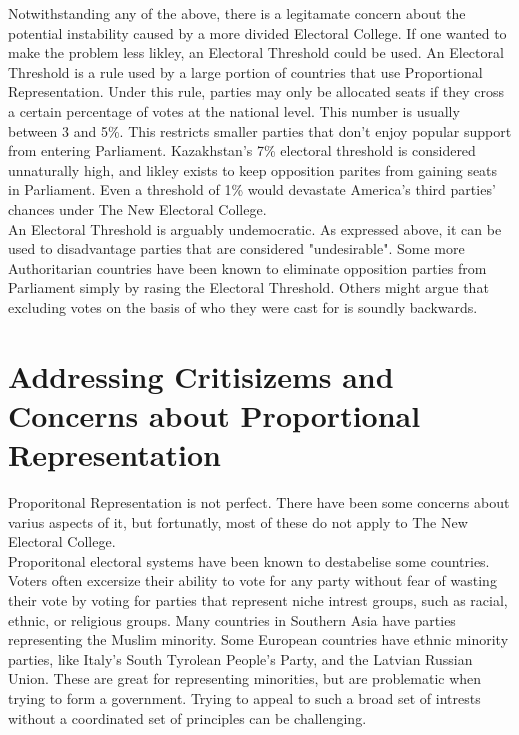 \documentclass{article}
\begin{document}
    Notwithstanding any of the above, there is a legitamate concern about the potential instability caused by a more divided Electoral College. If one wanted to make the problem less likley, an Electoral Threshold could be used. An Electoral Threshold is a rule used by a large portion of countries that use Proportional Representation. Under this rule, parties may only be allocated seats if they cross a certain percentage of votes at the national level. This number is usually between 3 and 5\%. This restricts smaller parties that don't enjoy popular support from entering Parliament. Kazakhstan's 7\% electoral threshold is considered unnaturally high, and likley exists to keep opposition parites from gaining seats in Parliament. Even a threshold of 1\% would devastate America's third parties' chances under The New Electoral College.\\

    An Electoral Threshold is arguably undemocratic. As expressed above, it can be used to disadvantage parties that are considered "undesirable". Some more Authoritarian countries have been known to eliminate opposition parties from Parliament simply by rasing the Electoral Threshold. Others might argue that excluding votes on the basis of who they were cast for is soundly backwards.\\

    \section{Addressing Critisizems and Concerns about Proportional Representation}%

    Proporitonal Representation is not perfect. There have been some concerns about varius aspects of it, but fortunatly, most of these do not apply to The New Electoral College.\\

    Proporitonal electoral systems have been known to destabelise some countries. Voters often excersize their ability to vote for any party without fear of wasting their vote by voting for parties that represent niche intrest groups, such as racial, ethnic, or religious groups. Many countries in Southern Asia have parties representing the Muslim minority. Some European countries have ethnic minority parties, like Italy's South Tyrolean People's Party, and the Latvian Russian Union. These are great for representing minorities, but are problematic when trying to form a government. Trying to appeal to such a broad set of intrests without a coordinated set of principles can be challenging.\\
\end{document}
